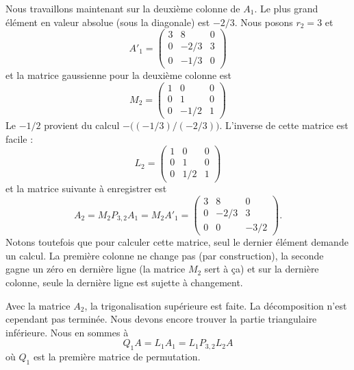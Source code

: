 \begin{example}
    Nous travaillons maintenant sur la deuxième colonne de \( A_1\). Le plus grand élément en valeur absolue (sous la diagonale) est \( -2/3\). Nous posons \( r_2=3\) et
    \begin{equation}
        A'_1=\begin{pmatrix}
            3    &   8    &   0    \\
            0    &   -2/3    &   3    \\
            0    &   -1/3    &   0
        \end{pmatrix}
    \end{equation}
    et la matrice gaussienne pour la deuxième colonne est
    \begin{equation}
        M_2=\begin{pmatrix}
            1    &   0    &   0    \\
            0    &   1    &   0    \\
            0    &   -1/2    &   1
        \end{pmatrix}
    \end{equation}
    Le \( -1/2\) provient du calcul \( -\big( (-1/3)/(-2/3) \big)\). L'inverse de cette matrice est facile :
    \begin{equation}
        L_2=\begin{pmatrix}
            1    &   0    &   0    \\
            0    &   1    &   0    \\
            0    &   1/2    &   1
        \end{pmatrix}
    \end{equation}
    et la matrice suivante à enregistrer est 
    \begin{equation}
        A_2=M_2P_{3,2}A_1=M_2A'_1=\begin{pmatrix}
            3    &   8    &   0    \\
            0    &   -2/3    &   3    \\
            0    &   0    &   -3/2
        \end{pmatrix}.
    \end{equation}
    Notons toutefois que pour calculer cette matrice, seul le dernier élément demande un calcul. La première colonne ne change pas (par construction), la seconde gagne un zéro en dernière ligne (la matrice \( M_2\) sert à ça) et sur la dernière colonne, seule la dernière ligne est sujette à changement.

    Avec la matrice \( A_2\), la trigonalisation supérieure est faite. La décomposition n'est cependant pas terminée. Nous devons encore trouver la partie triangulaire inférieure. Nous en sommes à
    \begin{equation}
        Q_1A=L_1A_1=L_1P_{3,2}L_2A
    \end{equation}
    où \( Q_1\) est la première matrice de permutation.


\end{example}
